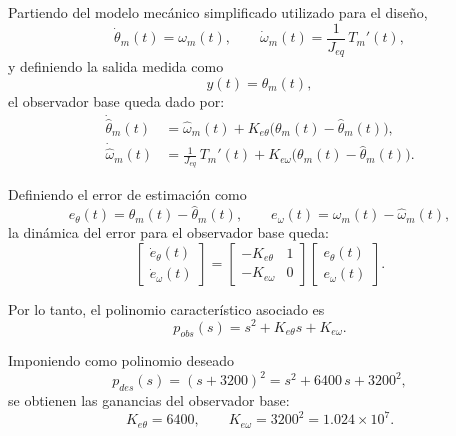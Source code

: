 \documentclass[12pt, a4paper,journal, onecolumn, compsoc]{IEEEtran}
\begin{document}
Partiendo del modelo mecánico simplificado utilizado para el diseño,
\begin{equation}
\dot{\theta}_m(t)=\omega_m(t), 
\qquad
\dot{\omega}_m(t)=\frac{1}{J_{eq}}\,T_m'(t),
\end{equation}
y definiendo la salida medida como
\begin{equation}
y(t)=\theta_m(t),
\end{equation}
el observador base queda dado por:
\begin{equation}
\label{eq:obs_base}
\begin{aligned}
    \dot{\hat{\theta}}_m(t) &= \hat{\omega}_m(t) + K_{e\theta}\big(\theta_m(t)-\hat{\theta}_m(t)\big), \\
    \dot{\hat{\omega}}_m(t) &= \frac{1}{J_{eq}}\,T_m'(t) + K_{e\omega}\big(\theta_m(t)-\hat{\theta}_m(t)\big).
\end{aligned}
\end{equation}

Definiendo el error de estimación como
\begin{equation}
e_\theta(t)=\theta_m(t)-\hat{\theta}_m(t),
\qquad
e_\omega(t)=\omega_m(t)-\hat{\omega}_m(t),
\end{equation}
la dinámica del error para el observador base queda:
\begin{equation}
\begin{bmatrix}
\dot e_\theta(t)\\
\dot e_\omega(t)
\end{bmatrix}
=
\begin{bmatrix}
-K_{e\theta} & 1\\
-K_{e\omega} & 0
\end{bmatrix}
\begin{bmatrix}
e_\theta(t)\\
e_\omega(t)
\end{bmatrix}.
\end{equation}

Por lo tanto, el polinomio característico asociado es
\begin{equation}
p_{obs}(s)=s^2+K_{e\theta}s+K_{e\omega}.
\end{equation}

Imponiendo como polinomio deseado
\begin{equation}
p_{des}(s)=(s+3200)^2=s^2+6400\,s+3200^2,
\end{equation}
se obtienen las ganancias del observador base:
\begin{equation}
\label{eq:ganancias_obs_base}
K_{e\theta}=6400,
\qquad
K_{e\omega}=3200^2=1.024\times10^7.
\end{equation}
\end{document}
